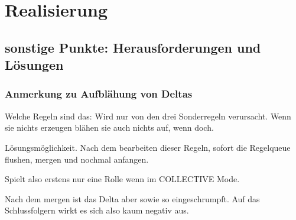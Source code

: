 \chapter{Realisierung}



\section{sonstige Punkte: Herausforderungen und Lösungen}


\subsection{Anmerkung zu Aufblähung von Deltas}
Welche Regeln sind das:
Wird nur von den drei Sonderregeln verursacht. Wenn sie nichts erzeugen blähen sie auch nichts auf, wenn doch.

Lösungsmöglichkeit. Nach dem bearbeiten dieser Regeln, sofort die Regelqueue flushen, mergen und nochmal anfangen.

Spielt also erstens nur eine Rolle wenn im COLLECTIVE Mode.

Nach dem mergen ist das Delta aber sowie so eingeschrumpft. Auf das Schlussfolgern wirkt es sich also kaum negativ aus.



